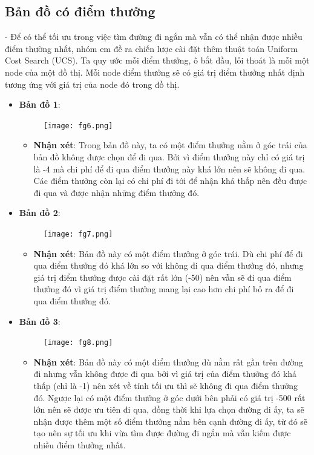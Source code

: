 \documentclass[11pt]{scrartcl} %
\begin{document}
\subsection{Bản đồ có điểm thưởng}
- Để có thể tối ưu trong việc tìm đường đi ngắn mà vẫn có thể nhận được nhiều điểm thường nhất, nhóm em đề ra chiến lược cài đặt thêm thuật toán Uniform Cost Search (UCS). Ta quy ước mỗi điểm thưởng, ô bắt đầu, lối thoát là mỗi một node của một đồ thị. Mỗi node điểm thưởng sẽ có giá trị điểm thưởng nhất định tương ứng với giá trị của node đó trong đồ thị.
\begin{itemize}
	\item \textbf{Bản đồ 1}:
	\begin{figure}[h] %
		\centering
		\texttt{[image: fg6.png]} %
	\end{figure}
	\begin{itemize}
		\item \textbf{Nhận xét}: Trong bản đồ này, ta có một điểm thưởng nằm ở góc trái của bản đồ không được chọn để đi qua. Bởi vì điểm thưởng này chỉ có giá trị là -4 mà chi phí để đi qua điểm thưởng này khá lớn nên sẽ không đi qua. Các điểm thưởng còn lại có chi phí đi tới để nhận khá thấp nên đều được đi qua và được nhận những điểm thưởng đó.
	\end{itemize}

	\newpage
	\item \textbf{Bản đồ 2}:
	\begin{figure}[h]
		\centering
		\texttt{[image: fg7.png]} %
	\end{figure}
	\begin{itemize}
		\item \textbf{Nhận xét}: Bản đồ này có một điểm thưởng ở góc trái. Dù chi phí để đi qua điểm thưởng đó khá lớn so với không đi qua điểm thưởng đó, nhưng giá trị điểm thưởng được cài đặt rất lớn (-50) nên vẫn sẽ đi qua điểm thưởng đó vì giá trị điểm thưởng mang lại cao hơn chi phí bỏ ra để đi qua điểm thưởng đó. 
	\end{itemize}

	\newpage
	\item \textbf{Bản đồ 3}:
	\begin{figure}[h]
		\centering
		\texttt{[image: fg8.png]} %
	\end{figure}
	\begin{itemize}
		\item \textbf{Nhận xét}: Bản đồ này có một điểm thưởng dù nằm rất gần trên đường đi nhưng vẫn không được đi qua bởi vì giá trị của điểm thưởng đó khá thấp (chỉ là -1) nên xét về tính tối ưu thì sẽ không đi qua điểm thưởng đó. Ngược lại có một điểm thưởng ở góc dưới bên phải có giá trị -500 rất lớn nên sẽ được ưu tiên đi qua, đồng thời khi lựa chọn đường đi ấy, ta sẽ nhận được thêm một số điểm thưởng nằm bên cạnh đường đi ấy, từ đó sẽ tạo nên sự tối ưu khi vừa tìm được đường đi ngắn mà vẫn kiếm được nhiều điểm thưởng nhất.
	\end{itemize}
\end{itemize}



\end{document}
